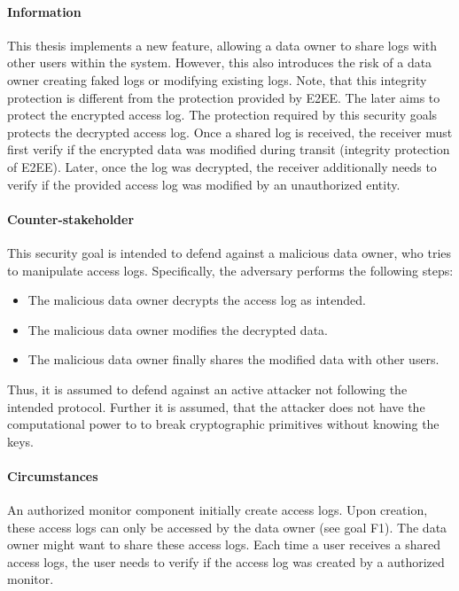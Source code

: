 \documentclass[../main.tex]{subfiles}
\begin{document}
\paragraph{Information}
This thesis implements a new feature, allowing a data owner to share logs with other users within the system.
However, this also introduces the risk of a data owner creating faked logs or modifying existing logs.
Note, that this integrity protection is different from the protection provided by E2EE.
The later aims to protect the encrypted access log.
The protection required by this security goals protects the decrypted access log.
Once a shared log is received, the receiver must first verify if the encrypted data was modified during transit (integrity protection of E2EE).
Later, once the log was decrypted, the receiver additionally needs to verify if the provided access log was modified by an unauthorized entity.
       
\paragraph{Counter-stakeholder}
This security goal is intended to defend against a malicious data owner, who tries to manipulate access logs. 
Specifically, the adversary performs the following steps:
\begin{itemize}
    \item The malicious data owner decrypts the access log as intended.
    \item The malicious data owner modifies the decrypted data.
    \item The malicious data owner finally shares the modified data with other users.
\end{itemize}
Thus, it is assumed to defend against an active attacker not following the intended protocol.
Further it is assumed, that the attacker does not have the computational power to to break cryptographic primitives without knowing the keys.

\paragraph{Circumstances}
An authorized monitor component initially create access logs. 
Upon creation, these access logs can only be accessed by the data owner (see goal F1).
The data owner might want to share these access logs.
Each time a user receives a shared access logs, the user needs to verify if the access log was created by a authorized monitor.
\end{document}

